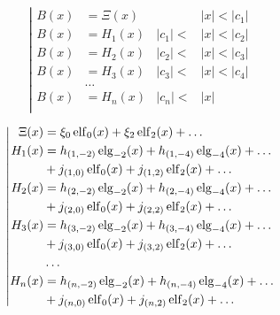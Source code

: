 \begin{equation*} \left| \begin{aligned}
B(x) &= \Xi(x) & 
&|x| < |c_1| \\
%
B(x) &= H_1(x) & 
|c_1| < &|x| < |c_2| \\
%
B(x) &= H_2(x) & 
|c_2| < &|x| < |c_3| \\
%
B(x) &= H_3(x) &
|c_3| < &|x| < |c_4| \\
&\ldots & & \\
%
B(x) &= H_n(x) &
|c_n| < &|x| \\
\end{aligned} \right. \end{equation*}

\begin{equation*} \left| \begin{aligned}
\Xi(x) &=
  \xi_0 \elf_0(x)
+ \xi_2 \elf_2(x)  
+ \ldots \\
%
H_1(x) &= 
  h_{(1,-2)} \elg_{-2}(x)
+ h_{(1,-4)} \elg_{-4}(x)
+ \ldots \\ &
+ j_{(1,0)} \elf_0(x)
+ j_{(1,2)} \elf_2(x)
+ \ldots \\
%
H_2(x) &= 
  h_{(2,-2)} \elg_{-2}(x)
+ h_{(2,-4)} \elg_{-4}(x)
+ \ldots \\ &
+ j_{(2,0)} \elf_0(x)
+ j_{(2,2)} \elf_2(x)
+ \ldots \\
%
H_3(x) &= 
  h_{(3,-2)} \elg_{-2}(x)
+ h_{(3,-4)} \elg_{-4}(x)
+ \ldots \\ &
+ j_{(3,0)} \elf_0(x)
+ j_{(3,2)} \elf_2(x)
+ \ldots \\
%
&\ldots \\
%
H_n(x) &= 
  h_{(n,-2)} \elg_{-2}(x)
+ h_{(n,-4)} \elg_{-4}(x)
+ \ldots \\ &
+ j_{(n,0)} \elf_0(x)
+ j_{(n,2)} \elf_2(x)
+ \ldots \\
\end{aligned} \right. \end{equation*}

